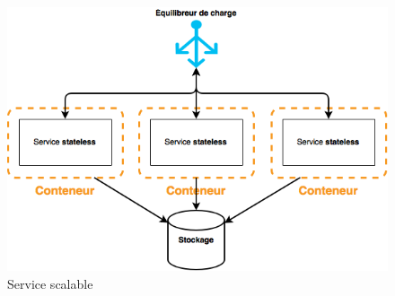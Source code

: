 \begin{onehalfspace}
\begin{figure}[H]
\centering
\includegraphics [scale=0.5]{chapitre4/assets/stateless}
\caption{Service scalable}
\label{fig:scalable}
\end{figure}


\end{onehalfspace}
